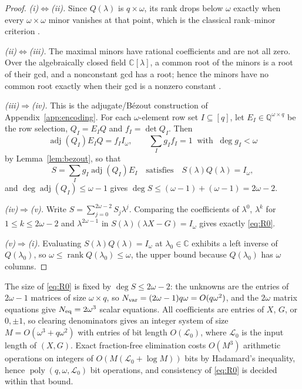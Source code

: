 \documentclass[journal]{IEEEtran}
\theoremstyle{plainn}
\theoremstyle{remark}
\begin{document}
\begin{proof}
\emph{(i)$\Leftrightarrow$(ii).} Since $Q(\lambda)$ is $q\times\omega$, its rank drops below
$\omega$ exactly when every $\omega\times\omega$ minor vanishes at that point, which is the
classical rank--minor criterion \cite[Ch.~0]{hj13}.

\emph{(ii)$\Leftrightarrow$(iii).} The maximal minors have rational coefficients and are not all
zero. Over the algebraically closed field $\mathbb C[\lambda]$, a common root of the minors is a
root of their gcd, and a nonconstant gcd has a root; hence the minors have no common root exactly
when their gcd is a nonzero constant \cite[Ch.~IV]{lan02}.

\emph{(iii)$\Rightarrow$(iv).} This is the adjugate/B\'ezout construction of
Appendix~\ref{app:encoding}. For each $\omega$-element row set
$I\subseteq[q]$, let $E_I\in\mathbb Q^{\omega\times q}$ be the row selection,
$Q_I=E_IQ$ and $f_I=\det Q_I$. Then
\begin{equation*}
\operatorname{adj}(Q_I)E_IQ=f_II_\omega,\qquad
\sum_Ig_If_I=1\ \text{ with }\ \deg g_I<\omega
\end{equation*}
by Lemma~\ref{lem:bezout}, so that
\begin{equation*}
S=\sum_Ig_I\operatorname{adj}(Q_I)E_I
\quad\text{satisfies}\quad
S(\lambda)Q(\lambda)=I_\omega ,
\end{equation*}
and $\deg\operatorname{adj}(Q_I)\le\omega-1$ gives
$\deg S\le(\omega-1)+(\omega-1)=2\omega-2$.

\emph{(iv)$\Rightarrow$(v).} Write $S=\sum_{j=0}^{2\omega-2}S_j\lambda^j$. Comparing the
coefficients of $\lambda^0$, $\lambda^k$ for $1\le k\le2\omega-2$ and $\lambda^{2\omega-1}$ in
$S(\lambda)(\lambda X-G)=I_\omega$ gives exactly \eqref{eq:R0}.

\emph{(v)$\Rightarrow$(i).} Evaluating $S(\lambda)Q(\lambda)=I_\omega$ at $\lambda_0\in\mathbb C$
exhibits a left inverse of $Q(\lambda_0)$, so $\omega\le\operatorname{rank}Q(\lambda_0)\le\omega$,
the upper bound because $Q(\lambda_0)$ has $\omega$ columns.
\end{proof}

The size of \eqref{eq:R0} is fixed by $\deg S\le2\omega-2$: the unknowns are the entries of
$2\omega-1$ matrices of size $\omega\times q$, so $N_{\rm var}=(2\omega-1)q\omega=O(q\omega^2)$,
and the $2\omega$ matrix equations give $N_{\rm eq}=2\omega^3$ scalar equations. All coefficients
are entries of $X$, $G$, or $0,\pm1$, so clearing denominators gives an integer system of size
$M=O(\omega^3+q\omega^2)$ with entries of bit length $O(\mathcal L_0)$, where $\mathcal L_0$ is the
input length of $(X,G)$. Exact fraction-free elimination costs $O(M^3)$ arithmetic operations on
integers of $O(M(\mathcal L_0+\log M))$ bits by Hadamard's inequality, hence
$\operatorname{poly}(q,\omega,\mathcal L_0)$ bit operations, and consistency of \eqref{eq:R0} is
decided within that bound.
\end{document}
